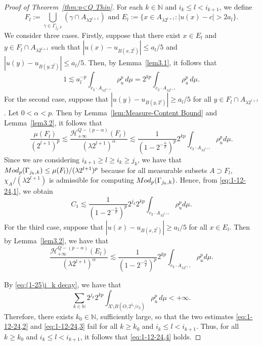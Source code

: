 \documentclass[10pt]{amsart}
\numberwithin{equation}{section}
\newcommand{\Mod}{{\rm Mod}}
\newcommand{\N}{\mathbb{N}}
\newcommand{\Ha}{\mathcal{H}}
\begin{document}
\begin{proof}[Proof of Theorem~\ref{thm:p<Q Thin}]
     For each $k\in\N$ and $i_k\leq l<i_{k+1}$, we define 
    \[
    \text{$F_l:=\bigcup_{\gamma\in\Gamma_{j_k,k}}(\gamma\cap A_{\lambda 2^{l+1}})$ \ and\  }
    E_{l}:=\{x\in A_{\lambda 2^{l+1}}:|u(x)-c|>2a_l\}.
    \]
    We consider three cases.  Firstly, suppose that there exist $x\in E_{l}$ and $y\in F_l\cap A_{\lambda 2^{l+1}}$ such that $|u(x)-u_{B(x,2^l)}|\le a_l/5$ and $|u(y)-u_{B(y,2^l)}|\le a_l/5$.  Then, by Lemma~\ref{lem3.1}, it follows that
    \begin{equation}\label{eq:1-12-24,2}
        1\lesssim a_l^{-p}\int_{c_2\cdot A_{\lambda 2^{l+1}}}\rho_u^p\,d\mu=2^{kp}\int_{c_2\cdot A_{\lambda 2^{l+1}}}\rho_u^p\,d\mu.
    \end{equation}
    For the second case, suppose that $|u(y)-u_{B(y,2^l)}|\ge a_l/5$ for all $y\in F_l\cap A_{\lambda 2^{l+1}}$. Let $0<\alpha<p$. Then by Lemma~\ref{lem:Measure-Content Bound} and Lemma~\ref{lem3.2}, it follows that 
    \begin{equation*}
        \frac{\mu(F_l)}{(2^{l+1})^p}\lesssim\frac{\Ha^{Q-(p-\alpha)}_{+\infty}(F_l)}{(\lambda 2^{l+1})^\alpha}\lesssim \frac{1}{(1-2^{-\frac{\alpha}{p}})^p} 2^{kp}\int_{c_2\cdot A_{\lambda 2^{l+1}}}\rho_u^pd\mu.
    \end{equation*}
    Since we are considering $i_{k+1}\ge l\ge i_k\geq j_k$, we have that $\Mod_p(\Gamma_{j_k,k})\leq \mu(F_l)/(\lambda 2^{l+1})^p$ because for all measurable subsets $A\supset F_l$, $\chi_{A}/(\lambda 2^{l+1})$ is admissible for computing $\Mod_p(\Gamma_{j_k,k})$.  Hence, from \eqref{eq:1-12-24,1}, we obtain
    \begin{equation}\label{eq:1-12-24,3}
       C_1\lesssim \frac{1}{(1-2^{-\frac{\alpha}{p}})^p} 2^{j_k}2^{kp}\int_{c_2\cdot A_{\lambda 2^{l+1}}}\rho_u^pd\mu.
    \end{equation}
    For the third case, suppose that $|u(x)-u_{B(x,2^l)}|\ge a_l/5$ for all $x\in E_{l}$.  Then by Lemma~\ref{lem3.2}, we have that
    \begin{equation}\label{eq:1-12-24,4}
        \frac{\Ha^{Q-(p-\alpha)}_{+\infty}(E_{l})}{(\lambda 2^{l+1})^\alpha}\lesssim \frac{1}{(1-2^{-\frac{\alpha}{p}})^p} 2^{kp}\int_{c_2\cdot A_{\lambda 2^{l+1}}}\rho_u^pd\mu.
    \end{equation}
    
    By \eqref{eq:(1-25)i_k decay}, we have that 
    \begin{equation}\label{eq:(1-25)i_k decay II}
    \sum_{k\in\N}2^{j_k}2^{kp}\int_{X\setminus B(O,2^{i_k}/c_2)}\rho_u^p\,d\mu<+\infty.
    \end{equation}
    Therefore, there exists $k_0\in\mathbb N$, sufficiently large, so that the two estimates \eqref{eq:1-12-24,2} and \eqref{eq:1-12-24,3} fail for all $k\geq k_0$ and $i_k\le l<i_{k+1}$.  Thus, for all $k\ge k_0$ and $i_k\le l<i_{k+1}$, it follows that \eqref{eq:1-12-24,4} holds.  
    

\end{proof}
\end{document}
